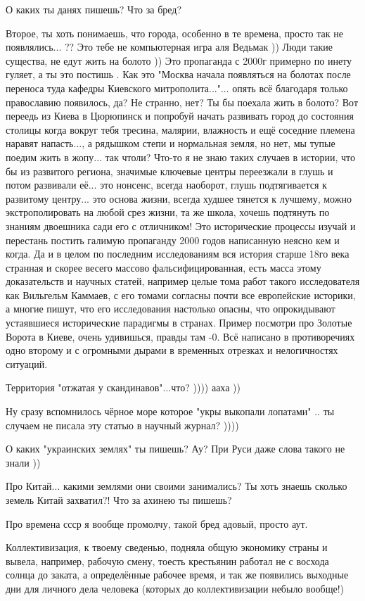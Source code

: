 \begin{itemize}
О каких ты данях пишешь? Что за бред?

Второе, ты хоть понимаешь, что города, особенно в те времена, просто так не
появлялись... ?? Это тебе не компьютерная игра аля Ведьмак )) Люди такие
существа, не едут жить на болото )) Это пропаганда с 2000г примерно по инету
гуляет, а ты это постишь . Как это "Москва начала появляться на болотах после
переноса туда кафедры Киевского митрополита..."... опять всё благодаря только
православию появилось, да? Не странно, нет? Ты бы поехала жить в болото? Вот
переедь из Киева в Цюрюпинск и попробуй начать развивать город до состояния
столицы когда вокруг тебя тресина, малярии, влажность и ещё соседние племена
наравят напасть..., а рядышком степи и нормальная земля, но нет, мы тупые
поедим жить в жопу... так чтоли? Что-то я не знаю таких случаев в истории, что
бы из развитого региона, значимые ключевые центры переезжали в глушь и потом
развивали её... это нонсенс, всегда наоборот, глушь подтягивается к развитому
центру... это основа жизни, всегда худшее тянется к лучшему, можно
экстрополировать на любой срез жизни, та же школа, хочешь подтянуть по знаниям
двоешника сади его с отличником! Это исторические процессы изучай и перестань
постить галимую пропаганду 2000 годов написанную неясно кем и когда. Да и в
целом по последним исследованиям вся история старше 18го века странная и скорее
весего массово фальсифицированная, есть масса этому доказательств и научных
статей, например целые тома работ такого исследователя как Вильгельм Каммаев, с
его томами согласны почти все европейские историки, а многие пишут, что его
исследования настолько опасны, что опрокидывают устаявшиеся исторические
парадигмы в странах. Пример посмотри про Золотые Ворота в Киеве, очень
удивишься, правды там -0. Всё написано в противоречиях одно второму и с
огромными дырами в временных отрезках и нелогичностях ситуаций.

Территория "отжатая у скандинавов"...что? )))) ааха ))

Ну сразу вспомнилось чёрное море которое "укры выкопали лопатами" .. ты случаем не писала эту статью в научный журнал? ))))

О каких "украинских землях" ты пишешь? Ау? При Руси даже слова такого не знали ))

Про Китай... какими землями они своими занимались? Ты хоть знаешь сколько земель Китай захватил?! Что за ахинею ты пишешь?

Про времена ссср я вообще промолчу, такой бред адовый, просто аут.

Коллективизация, к твоему сведенью, подняла общую экономику страны и вывела,
например, рабочую смену, тоесть крестьянин работал не с восхода солнца до
заката, а определённые рабочее время, и так же появились выходные дни для
личного дела человека (которых до коллективизации небыло вообще!)


\end{itemize}
